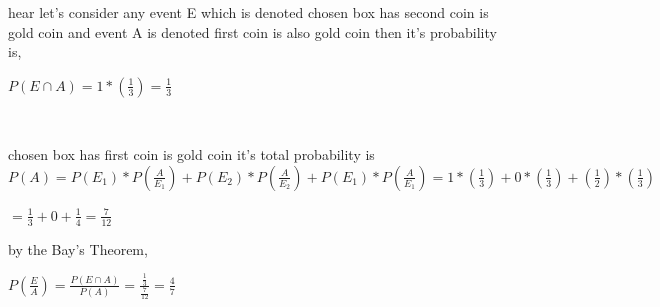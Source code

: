 \documentclass[a4paper,12pt]{article}
\theoremstyle{definition}
\begin{document}
\par hear let's consider any event E which is denoted chosen box has second coin is gold coin and event A is denoted first coin is also gold coin then it's probability is,\\
\begin{center}
      $P(E \cap A) = 1 *(\frac{1}{3}) = \frac{1}{3}$
\end{center}\\
\par chosen box has first coin is gold coin it's total probability is\\

      $ P(A) = P(E_1)*P(\frac{A}{E_1}) + P(E_2)*P(\frac{A}{E_2}) + P(E_1)*P(\frac{A}{E_1}) = 1*(\frac{1}{3}) + 0*(\frac{1}{3}) +(\frac{1}{2})*(\frac{1}{3}) $\\
\par $ = \frac{1}{3} + 0 + \frac{1}{4} = \frac{7}{12}$
\\
\par by the Bay's Theorem,
\begin{center}
       $ P(\frac{E}{A}) = \frac{P(E \cap A)}{P(A)} = \frac{\frac{1}{3}}{\frac{7}{12}} = \frac{4}{7} $

\end{center}







    
















 



 





 
\end{document}
